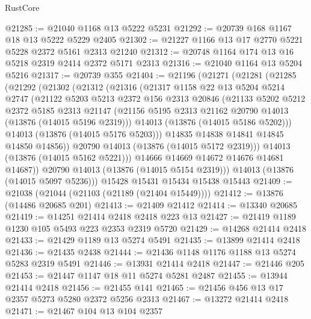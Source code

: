 \begin{lexlean}{RustCore}
\begin{coremodule}
@21285 := @21040 @1168 @13 @5222 @5231
@21292 := @20739 @168 @1167 @18 @13 @5222 @5229 @2405
@21302 := @21227 @1166 @13 @17 @2770 @5221 @5228 @2372 @5161 @2313 @21240
@21312 := @20748 @1164 @174 @13 @16 @5218 @2319 @2414 @2372 @5171 @2313
@21316 := @21040 @1164 @13 @5204 @5216
@21317 := @20739 @355
@21404 := @21196
    (@21271
      (@21281
        (@21285
          (@21292
            (@21302
              (@21312
                (@21316
                  (@21317
                    @1158
                    @22
                    @13
                    @5204
                    @5214
                    @2747
                    (@21122
                      @5203
                      @5213
                      @2372
                      @156
                      @2313
                      @20846
                      (@21133
                        @5202
                        @5212
                        @2372
                        @5185
                        @2313
                        @21147
                        (@21156 @5195 @2313 @21162 @20790 @14013 (@13876 (@14015 @5196 @2319)))
                        @14013
                        (@13876 (@14015 @5186 @5202)))
                      @14013
                      (@13876 (@14015 @5176 @5203)))
                    @14835
                    @14838
                    @14841
                    @14845
                    @14850
                    @14856))
                @20790
                @14013
                (@13876 (@14015 @5172 @2319)))
              @14013
              (@13876 (@14015 @5162 @5221)))
            @14666
            @14669
            @14672
            @14676
            @14681
            @14687))
        @20790
        @14013
        (@13876 (@14015 @5154 @2319)))
      @14013
      (@13876 (@14015 @5097 @5236)))
    @15428
    @15431
    @15434
    @15438
    @15443
@21409 := @21038 (@21044 (@21103 (@21189 (@21404 @15449))))
@21412 := @13876 (@14486 @20685 @201)
@21413 := @21409 @21412
@21414 := @13340 @20685
@21419 := @14251 @21414 @2418 @2418 @223 @13
@21427 := @21419 @1189 @1230 @105 @5493 @223 @2353 @2319 @5720
@21429 := @14268 @21414 @2418
@21433 := @21429 @1189 @13 @5274 @5491
@21435 := @13899 @21414 @2418
@21436 := @21435 @2438
@21444 := @21436 @1148 @1176 @1188 @13 @5274 @5283 @2319 @5491
@21446 := @13931 @21414 @2418
@21447 := @21446 @205
@21453 := @21447 @1147 @18 @11 @5274 @5281 @2487
@21455 := @13944 @21414 @2418
@21456 := @21455 @141
@21465 := @21456 @456 @13 @17 @2357 @5273 @5280 @2372 @5256 @2313
@21467 := @13272 @21414 @2418
@21471 := @21467 @104 @13 @104 @2357

\end{coremodule}
\end{lexlean}
